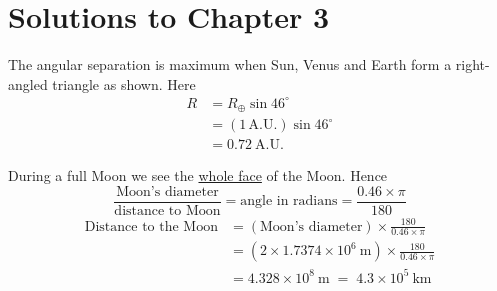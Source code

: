 \clearpage
\section*{Solutions to Chapter 3}

The angular separation is maximum when Sun, Venus and Earth form a
right-angled triangle as shown. Here
\begin{align*}
R &= R_\oplus \sin 46^\circ\\
  &= (1\,\mathrm{A.U.})\sin 46^\circ\\
  &= 0.72\ \mathrm{A.U.}
\end{align*}

During a full Moon we see the \underline{whole face} of the Moon. Hence
\[
\frac{\text{Moon's diameter}}{\text{distance to Moon}}
  = \text{angle in radians}
  = \frac{0.46 \times \pi}{180}
\]
\begin{align*}
\text{Distance to the Moon}
  &= \left(\text{Moon's diameter}\right)\times\frac{180}{0.46\times\pi}\\
  &= \left(2\times 1.7374\times 10^{6}\ \mathrm{m}\right)
     \times\frac{180}{0.46\times\pi}\\
  &= 4.328\times 10^{8}\ \mathrm{m} \;=\; 4.3\times 10^{5}\ \mathrm{km}
\end{align*}

